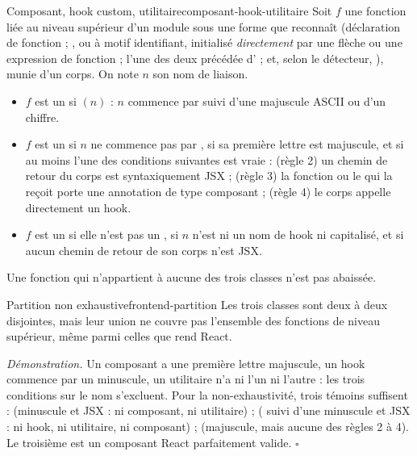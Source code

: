 \begin{definition}{Composant, hook custom, utilitaire}{composant-hook-utilitaire}
Soit $f$ une fonction liée au niveau supérieur d'un module sous une forme que reconnaît  (déclaration de fonction ; ,  ou  à motif identifiant, initialisé \emph{directement} par une flèche ou une expression de fonction ; l'une des deux précédée d' ; et, selon le détecteur, ), munie d'un corps. On note $n$ son nom de liaison.
\begin{itemize}
  \item $f$ est un  si $(n)$ : $n$ commence par  suivi d'une majuscule ASCII ou d'un chiffre.
  \item $f$ est un  si $n$ ne commence pas par , si sa première lettre est majuscule, et si au moins l'une des conditions suivantes est vraie : (règle 2) un chemin de retour du corps est syntaxiquement JSX ; (règle 3) la fonction ou le  qui la reçoit porte une annotation de type composant ; (règle 4) le corps appelle directement un hook.
  \item $f$ est un  si elle n'est pas un , si $n$ n'est ni un nom de hook ni capitalisé, et si aucun chemin de retour de son corps n'est JSX.
\end{itemize}
Une fonction qui n'appartient à aucune des trois classes n'est pas abaissée.
\end{definition}

\begin{proposition}{Partition non exhaustive}{frontend-partition}
Les trois classes sont deux à deux disjointes, mais leur union ne couvre pas l'ensemble des fonctions de niveau supérieur, même parmi celles que rend React.
\end{proposition}

\noindent\emph{Démonstration.} Un composant a une première lettre majuscule, un hook commence par un  minuscule, un utilitaire n'a ni l'un ni l'autre : les trois conditions sur le nom s'excluent. Pour la non-exhaustivité, trois témoins suffisent :  (minuscule et JSX : ni composant, ni utilitaire) ;  ( suivi d'une minuscule et JSX : ni hook, ni utilitaire, ni composant) ;  (majuscule, mais aucune des règles 2 à 4). Le troisième est un composant React parfaitement valide. $\square$

